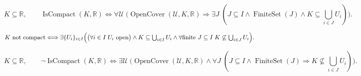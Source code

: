 \begin{remark*}
\[
K\subseteq\mathbb{R},\qquad
\operatorname{IsCompact}(K,\mathbb{R})
\Longleftrightarrow
\forall \mathcal{U}\;\bigl(\operatorname{OpenCover}(\mathcal{U},K,\mathbb{R})
\Longrightarrow \exists J\;(J\subseteq I\land \operatorname{FiniteSet}(J)
\land K\subseteq\textstyle\bigcup_{i\in J}U_i)\bigr).
\]
\end{remark*}
\begin{remark*}
\[
K \text{ not compact} \Longleftrightarrow \exists \{U_i\}_{i\in I}\Bigl(\bigl(\forall i\in I\;U_i \text{ open}\bigr)\land K\subseteq\textstyle\bigcup_{i\in I}U_i \land \forall \text{finite } J\subseteq I\;K\not\subseteq\textstyle\bigcup_{i\in J}U_i\Bigr).
\]
\end{remark*}
\begin{remark*}
\[
K\subseteq\mathbb{R},\qquad
\neg\operatorname{IsCompact}(K,\mathbb{R})
\Longleftrightarrow
\exists \mathcal{U}\;\bigl(\operatorname{OpenCover}(\mathcal{U},K,\mathbb{R})
\land \forall J\;(J\subseteq I\land \operatorname{FiniteSet}(J)
\Longrightarrow K\not\subseteq\textstyle\bigcup_{i\in J}U_i)\bigr).
\]
\end{remark*}

